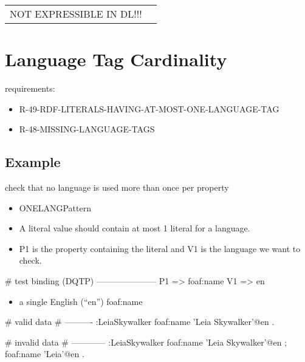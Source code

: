 \documentclass{llncs}
\newenvironment{DL}{
	\begin{center}
  \begin{tabular}{r l}

}{
  \end{tabular}
	\end{center}
}
\begin{document}
\begin{DL}
NOT EXPRESSIBLE IN DL!!!
\end{DL}

\section{Language Tag Cardinality}

requirements:

\begin{itemize}
	\item R-49-RDF-LITERALS-HAVING-AT-MOST-ONE-LANGUAGE-TAG
	\item R-48-MISSING-LANGUAGE-TAGS
\end{itemize}
 


\subsection{Example}

check that no language is used more than once per property


\begin{itemize}
	\item ONELANGPattern \cite{Kontokostas2014} 
  \item A literal value should contain at most 1 literal for a language. 
  \item P1 is the property containing the literal and V1 is the language we want to check.
\end{itemize}

\begin{ex}
# test binding (DQTP)
---------------------
P1 => foaf:name
V1 => en
\end{ex}

\begin{itemize}
	\item a single English (“en”) foaf:name
\end{itemize}

\begin{ex}
# valid data
# ----------
:LeiaSkywalker
    foaf:name 'Leia Skywalker'@en .
\end{ex}

\begin{ex}
# invalid data
# ------------
:LeiaSkywalker
    foaf:name 'Leia Skywalker'@en ;
    foaf:name 'Leia'@en .
\end{ex}
\end{document}

